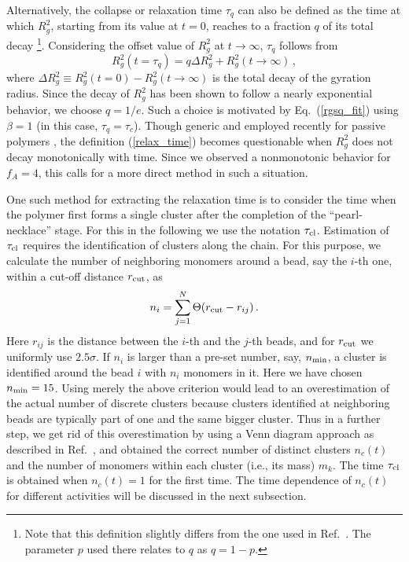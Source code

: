 \documentclass[aps,prx,reprint,showpacs,showkeys,noeprint,longbibliography]{revtex4-1} %
\begin{document}
\par  
Alternatively, the collapse or relaxation time $\tau_q$ can also be defined as the time at which $R_g^2$, starting from its value at $t=0$,  reaches to a fraction $q$ of its total decay \footnote{Note that this definition slightly differs from the one used in Ref.\ \cite{majumder3}. The parameter $p$ used there relates to $q$ as $q=1-p$.}.  Considering the offset value of $R_g^2$ at $t \to \infty$, $\tau_q$  follows from \cite{majumder3} 
\begin{equation}\label{relax_time}
R_g^2 (t=\tau_q) = q \Delta R_g^2 + R_g^2(t \to \infty)\,,
\end{equation}
where $\Delta R_g^2 \equiv R_g^2 (t=0) - R_g^2 (t \to \infty)$ is the total decay of the gyration radius.  Since the decay of $R_g^2$ has been shown to follow a nearly exponential behavior, we choose $q=1/e$. Such a choice is motivated by Eq.~(\ref{rgsq_fit}) using $\beta=1$ (in this case, $\tau_q = \tau_c$). Though generic and employed recently for passive polymers \cite{majumder3,majumder4}, the definition (\ref{relax_time}) becomes questionable when $R_g^2$ does not decay monotonically with time. Since we observed a nonmonotonic behavior for $f_A=4$, this calls for a more direct method in such a situation.
\par 
 One such method for extracting the relaxation time is to consider the time when the polymer first forms a single cluster after the completion of the ``pearl-necklace'' stage. For this in the following we use the notation $\tau_{\rm{cl}}$. Estimation of $\tau_{\rm{cl}}$ requires the identification of clusters along the chain. For this purpose, we calculate the number of neighboring monomers around a bead, say the $i$-th one, within a cut-off distance $r_{\rm{cut}}$, as 
\begin{equation}
n_i=\sum_{j=1}^{N} \Theta (r_{\rm{cut}}-r_{ij})\,.
\end{equation}
Here $r_{ij}$ is the distance between the $i$-th and the $j$-th beads, and for  $r_{\rm{cut}}$ we uniformly use $2.5\sigma$. If $n_i$ is larger than a pre-set number, say, $n_{\rm{min}}$, a cluster is identified around the bead $i$ with $n_i$ monomers in it. Here we have chosen $n_{\rm{min}}=15$.  Using merely the above criterion would lead to an overestimation of the actual number of discrete clusters because clusters identified at neighboring beads are  typically part of one and the same  bigger cluster. Thus in a further step, we get rid of this overestimation by using a Venn diagram approach as described in Ref.~\cite{majumder4}, and obtained the correct number of distinct clusters $n_c(t)$ and the number of monomers within each cluster (i.e., its mass) $m_k$.  The time $\tau_{\rm{cl}}$ is obtained when $n_c(t)=1$ for the first time. The time dependence of $n_c(t)$ for different activities will be discussed in the next subsection.
\end{document}
